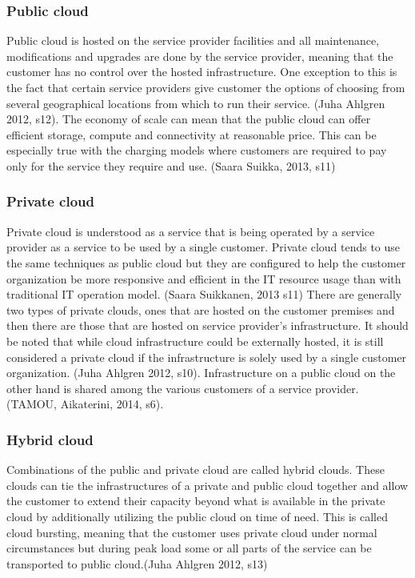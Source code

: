 \documentclass{article}
\begin{document}
\subsubsection{Public cloud}
Public cloud is hosted on the service provider facilities and all maintenance, modifications and upgrades are done by the service provider, meaning that the customer has no control over the hosted infrastructure. One exception to this is the fact that certain service providers give customer the options of choosing from several geographical locations from which to run their service. (Juha Ahlgren 2012, s12).
The economy of scale can mean that the public cloud can offer efficient storage, compute and connectivity at reasonable price. This can be especially true with the charging models where customers are required to pay only for the service they require and use. (Saara Suikka, 2013, s11)
\subsubsection{Private cloud}
Private cloud is understood as a service that is being operated by a service provider as a service to be used by a single customer. Private cloud tends to use the same techniques as public cloud but they are configured to help the customer organization be more responsive and efficient in the IT resource usage than with traditional IT operation model. (Saara Suikkanen, 2013 s11)
There are generally two types of private clouds, ones that are hosted on the customer premises and then there are those that are hosted on service provider's infrastructure. It should be noted that while cloud infrastructure could be externally hosted, it is still considered a private cloud if the infrastructure is solely used by a single customer organization. (Juha Ahlgren 2012, s10).
Infrastructure on a public cloud on the other hand is shared among the various customers of a service provider. (TAMOU, Aikaterini, 2014, s6).
\subsubsection{Hybrid cloud}
Combinations of the public and private cloud are called hybrid clouds. These clouds can tie the infrastructures of a private and public cloud together and allow the customer to extend their capacity beyond what is available in the private cloud by additionally utilizing the public cloud on time of need. This is called cloud bursting, meaning that the customer uses private cloud under normal circumstances but during peak load some or all parts of the service can be transported to public cloud.(Juha Ahlgren 2012, s13)
\end{document}
